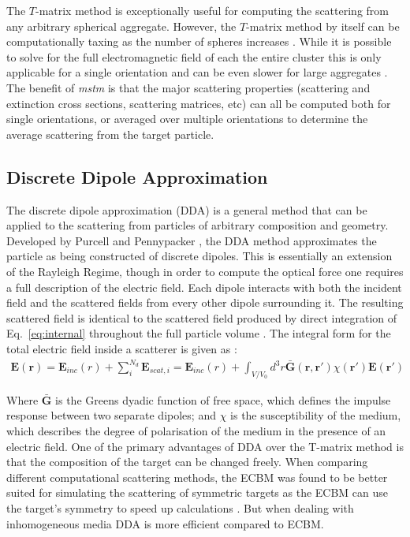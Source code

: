 The $T$-matrix method is exceptionally useful for computing the 
scattering from any arbitrary spherical aggregate. However, the 
$T$-matrix method by itself can be computationally taxing as the 
number of spheres increases \cite{Mackowski2011}. While it is 
possible to solve for the full electromagnetic field of each the 
entire cluster this is only applicable for a single orientation 
and can be even slower for large aggregates \cite{Mackowski1996, 
Xu1995}. The benefit of \textit{mstm} is that the major scattering 
properties (scattering and extinction cross sections, scattering 
matrices, etc) can all be computed both for single orientations, 
or averaged over multiple orientations to determine the average 
scattering from the target particle. 

\subsection{Discrete Dipole Approximation}
The discrete dipole approximation (DDA) is a general method that 
can be applied to the scattering from particles of arbitrary 
composition and geometry. Developed by Purcell and Pennypacker 
\cite{Purcell1973}, the DDA method approximates the particle as 
being constructed of discrete dipoles. This is essentially an 
extension of the Rayleigh Regime, though in order to compute the 
optical force one requires a full description of the electric 
field. Each dipole interacts with both the incident field and the 
scattered fields from every other dipole surrounding it. The 
resulting scattered field is identical to the scattered field 
produced by direct integration of Eq.~\eqref{eq:internal} 
throughout the full particle volume \cite{Goedecke1988}. The 
integral form for the total electric field inside a scatterer is 
given as \cite{Wriedt1998}:
\begin{align}
	\mathbf{E(r)} = \mathbf{E}_{inc}(r) + \sum^{N_d}_{i}\mathbf{E}_{scat,i} =  
	\mathbf{E}_{inc}(r) + \int_{V/V_0}d^3r\mathbf{\bar{G}(r,r')}
	\chi(\mathbf{r'})\mathbf{E(r')}
	\label{eq:DDA}
\end{align}

Where $\mathbf{\bar{G}}$ is the Greens dyadic function of free space, 
which defines the impulse response between two separate dipoles; and 
$\chi$ is the susceptibility of the medium, which describes the 
degree of polarisation of the medium in the presence of an electric 
field. One of the primary advantages of DDA over the T-matrix method 
is that the composition of the target can be changed freely. When 
comparing different computational scattering methods, the ECBM was 
found to be better suited for simulating the scattering of symmetric
targets as the ECBM can use the target's symmetry to speed up 
calculations \cite{Wriedt1998}. But when dealing with inhomogeneous 
media DDA is more efficient compared to ECBM. 

